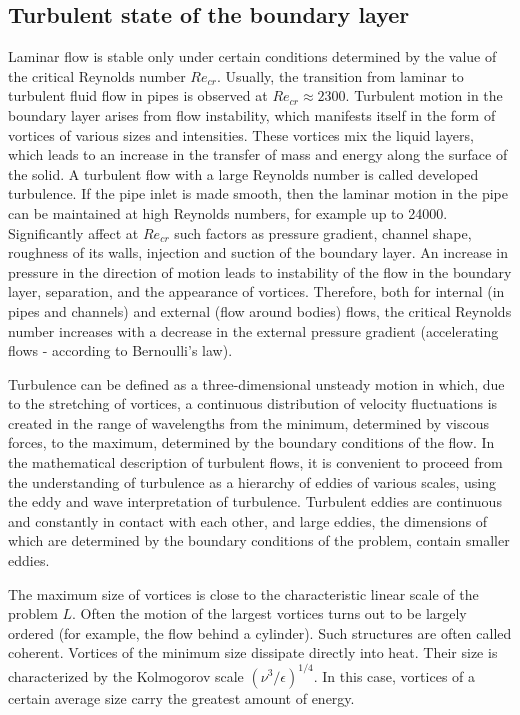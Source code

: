 \subsection{Turbulent state of the boundary layer}
	Laminar flow is stable only under certain conditions determined by the value of the critical Reynolds number $Re_{cr}$. Usually, the transition from laminar to turbulent fluid flow in pipes is observed at $Re_{cr} \approx 2300$. Turbulent motion in the boundary layer arises from flow instability, which manifests itself in the form of vortices of various sizes and intensities. These vortices mix the liquid layers, which leads to an increase in the transfer of mass and energy along the surface of the solid. A turbulent flow with a large Reynolds number is called developed turbulence. If the pipe inlet is made smooth, then the laminar motion in the pipe can be maintained at high Reynolds numbers, for example up to 24000. Significantly affect at $Re_{cr}$ such factors as pressure gradient, channel shape, roughness of its walls, injection and suction of the boundary layer. An increase in pressure in the direction of motion leads to instability of the flow in the boundary layer, separation, and the appearance of vortices. Therefore, both for internal (in pipes and channels) and external (flow around bodies) flows, the critical Reynolds number increases with a decrease in the external pressure gradient (accelerating flows - according to Bernoulli's law).
	
	Turbulence can be defined as a three-dimensional unsteady motion in which, due to the stretching of vortices, a continuous distribution of velocity fluctuations is created in the range of wavelengths from the minimum, determined by viscous forces, to the maximum, determined by the boundary conditions of the flow. In the mathematical description of turbulent flows, it is convenient to proceed from the understanding of turbulence as a hierarchy of eddies of various scales, using the eddy and wave interpretation of turbulence\cite{Монин1992}. Turbulent eddies are continuous and constantly in contact with each other, and large eddies, the dimensions of which are determined by the boundary conditions of the problem, contain smaller eddies.
	
	The maximum size of vortices is close to the characteristic linear scale of the problem $L$. Often the motion of the largest vortices turns out to be largely ordered (for example, the flow behind a cylinder). Such structures are often called coherent. Vortices of the minimum size dissipate directly into heat. Their size is characterized by the Kolmogorov scale $(\nu^3/\epsilon)^{1/4}$. In this case, vortices of a certain average size carry the greatest amount of energy.
	
